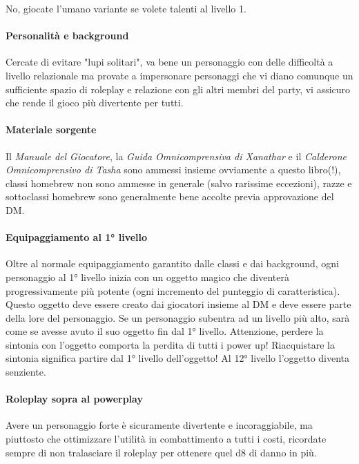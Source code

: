 No, giocate l'umano variante se volete talenti al livello 1.

\paragraph{Personalità e background}

Cercate di evitare "lupi solitari", va bene un personaggio con delle difficoltà a livello relazionale ma provate a impersonare personaggi che vi diano comunque un sufficiente spazio di roleplay e relazione con gli altri membri del party, vi assicuro che rende il gioco più divertente per tutti.

\paragraph{Materiale sorgente}

Il \textit{Manuale del Giocatore}, la \textit{Guida Omnicomprensiva di Xanathar} e il \textit{Calderone Omnicomprensivo di Tasha} sono ammessi insieme ovviamente a questo libro(!), classi homebrew non sono ammesse in generale (salvo rarissime eccezioni), razze e sottoclassi homebrew sono generalmente bene accolte previa approvazione del DM. 

\paragraph{Equipaggiamento al 1° livello}

Oltre al normale equipaggiamento garantito dalle classi e dai background, ogni personaggio al 1° livello inizia con un oggetto magico che diventerà progressivamente più potente (ogni incremento del punteggio di caratteristica). Questo oggetto deve essere creato dai giocatori insieme al DM e deve essere parte della lore del personaggio. Se un personaggio subentra ad un livello più alto, sarà come se avesse avuto il suo oggetto fin dal 1° livello. Attenzione, perdere la sintonia con l'oggetto comporta la perdita di tutti i power up! Riacquistare la sintonia significa partire dal 1° livello dell'oggetto! Al 12° livello l'oggetto diventa senziente.

\paragraph{Roleplay sopra al powerplay}

Avere un personaggio forte è sicuramente divertente e incoraggiabile, ma piuttosto che ottimizzare l'utilità in combattimento a tutti i costi, ricordate sempre di non tralasciare il roleplay per ottenere quel d8 di danno in più.

